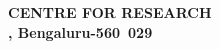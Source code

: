 \begin{titlepage}
\begin{center}
	
	
	 \vspace{0.6cm} 
	
				
		
	\begin{figure}[!hb]
	\end{figure}
			
	\textbf{\large{
			CENTRE FOR RESEARCH\\ \vspace{0.3cm}
			\UniversityName, Bengaluru-560~029 \vspace{0.3cm}
		}} 
		\\
	\textbf{\ProjectDate}
\end{center}

\end{titlepage}

\clearpage